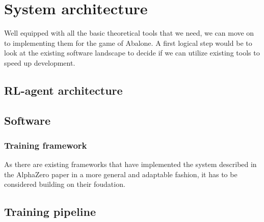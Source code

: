 \chapter{System architecture}
Well equipped with all the basic theoretical tools that we need, we can move on to implementing them for the game of Abalone. A first logical step would be to look at the existing software landscape to decide if we can utilize existing tools to speed up development.

\section{RL-agent architecture}

\section{Software}
\subsection{Training framework}
As there are existing frameworks that have implemented the system described in the AlphaZero paper in a more general and adaptable fashion, it has to be considered building on their foudation.

\section{Training pipeline}